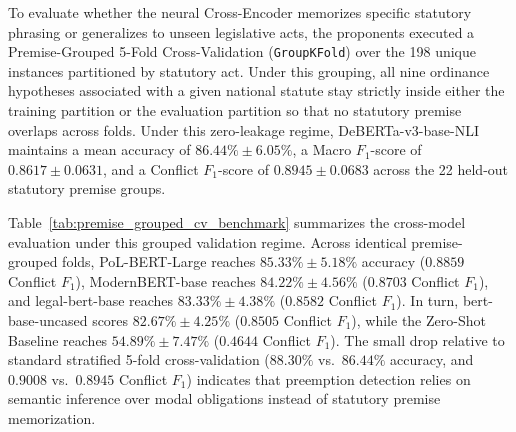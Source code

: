 To evaluate whether the neural Cross-Encoder memorizes specific statutory phrasing or generalizes to unseen legislative acts, the proponents executed a Premise-Grouped 5-Fold Cross-Validation (\texttt{GroupKFold}) over the 198 unique instances partitioned by statutory act. Under this grouping, all nine ordinance hypotheses associated with a given national statute stay strictly inside either the training partition or the evaluation partition so that no statutory premise overlaps across folds. Under this zero-leakage regime, DeBERTa-v3-base-NLI maintains a mean accuracy of $86.44\% \pm 6.05\%$, a Macro $F_1$-score of $0.8617 \pm 0.0631$, and a Conflict $F_1$-score of $0.8945 \pm 0.0683$ across the 22 held-out statutory premise groups.

Table~\ref{tab:premise_grouped_cv_benchmark} summarizes the cross-model evaluation under this grouped validation regime. Across identical premise-grouped folds, PoL-BERT-Large reaches $85.33\% \pm 5.18\%$ accuracy ($0.8859$ Conflict $F_1$), ModernBERT-base reaches $84.22\% \pm 4.56\%$ ($0.8703$ Conflict $F_1$), and legal-bert-base reaches $83.33\% \pm 4.38\%$ ($0.8582$ Conflict $F_1$). In turn, bert-base-uncased scores $82.67\% \pm 4.25\%$ ($0.8505$ Conflict $F_1$), while the Zero-Shot Baseline reaches $54.89\% \pm 7.47\%$ ($0.4644$ Conflict $F_1$). The small drop relative to standard stratified 5-fold cross-validation ($88.30\%$ vs.\ $86.44\%$ accuracy, and $0.9008$ vs.\ $0.8945$ Conflict $F_1$) indicates that preemption detection relies on semantic inference over modal obligations instead of statutory premise memorization.


